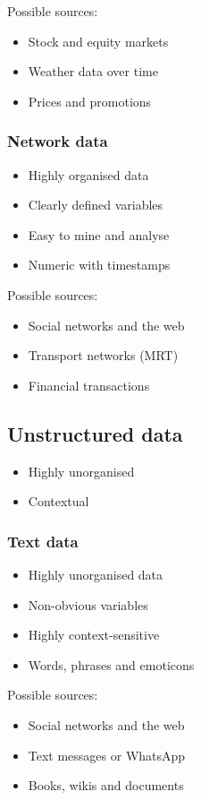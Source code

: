 \documentclass[11pt]{article}
\begin{document}
Possible sources:
\begin{itemize}
\item Stock and equity markets
\item Weather data over time
\item Prices and promotions
\end{itemize}

 \newpage
\subsubsection{Network data}
\label{sec:org0c2b75d}
\begin{itemize}
\item Highly organised data
\item Clearly defined variables
\item Easy to mine and analyse
\item Numeric with timestamps
\end{itemize}

Possible sources:
\begin{itemize}
\item Social networks and the web
\item Transport networks (MRT)
\item Financial transactions
\end{itemize}
\subsection{Unstructured data}
\label{sec:org5bbf434}
\begin{itemize}
\item Highly unorganised
\item Contextual
\end{itemize}
\subsubsection{Text data}
\label{sec:orgaf694cb}
\begin{itemize}
\item Highly unorganised data
\item Non-obvious variables
\item Highly context-sensitive
\item Words, phrases and emoticons
\end{itemize}

Possible sources:
\begin{itemize}
\item Social networks and the web
\item Text messages or WhatsApp
\item Books, wikis and documents
\end{itemize}
\end{document}

